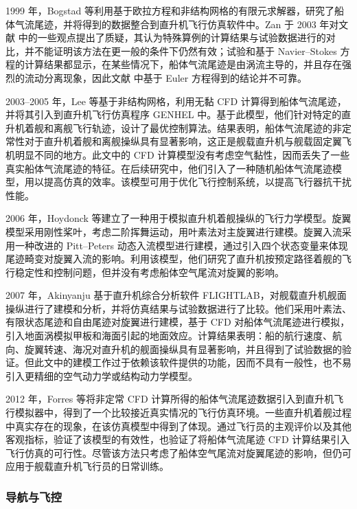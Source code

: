 1999 年，Bogstad 等利用基于欧拉方程和非结构网格的有限元求解器，研究了船体气流尾迹，并将得到的数据整合到直升机飞行仿真软件中。Zan
于 2003 年对文献 \cite{Bogstad2002} 中的一些观点提出了质疑，其认为特殊算例的计算结果与试验数据进行的对比，并不能证明该方法在更一般的条件下仍然有效；试验和基于
Navier–Stokes 方程的计算结果都显示，在某些情况下，船体气流尾迹是由涡流主导的，并且存在强烈的流动分离现象，因此文献 \cite{Bogstad2002}
中基于 Euler 方程得到的结论并不可靠。

2003–2005 年，Lee 等基于非结构网格，利用无黏 CFD 计算得到船体气流尾迹，并将其引入到直升机飞行仿真程序
GENHEL 中。基于此模型，他们针对特定的直升机着舰和离舰飞行轨迹，设计了最优控制算法。结果表明，船体气流尾迹的非定常性对于直升机着舰和离舰操纵具有显著影响，这正是舰载直升机与舰载固定翼飞机明显不同的地方。此文中的
CFD 计算模型没有考虑空气黏性，因而丢失了一些真实船体气流尾迹的特征。在后续研究中，他们引入了一种随机船体气流尾迹模型，用以提高仿真的效率。该模型可用于优化飞行控制系统，以提高飞行器抗干扰性能。

2006 年，Hoydonck 等建立了一种用于模拟直升机着舰操纵的飞行力学模型。旋翼模型采用刚性桨叶，考虑二阶挥舞运动，用叶素法对主旋翼进行建模。旋翼入流采用一种改进的
Pitt–Peters 动态入流模型进行建模，通过引入四个状态变量来体现尾迹畸变对旋翼入流的影响。利用该模型，他们研究了直升机按预定路径着舰的飞行稳定性和控制问题，但并没有考虑船体空气尾流对旋翼的影响。

2007 年，Akinyanju 基于直升机综合分析软件 FLIGHTLAB，对舰载直升机舰面操纵进行了建模和分析，并将仿真结果与试验数据进行了比较。他们采用叶素法、有限状态尾迹和自由尾迹对旋翼进行建模，基于
CFD 对船体气流尾迹进行模拟，引入地面涡模拟甲板和海面引起的地面效应。计算结果表明：船的航行速度、航向、旋翼转速、海况对直升机的舰面操纵具有显著影响，并且得到了试验数据的验证。但此文中的建模工作过于依赖该软件提供的功能，因而不具有一般性，也不易引入更精细的空气动力学或结构动力学模型。

2012 年，Forres 等将非定常 CFD 计算所得的船体气流尾迹数据引入到直升机飞行模拟器中，得到了一个比较接近真实情况的飞行仿真环境。一些直升机着舰过程中真实存在的现象，在该仿真模型中得到了体现。通过飞行员的主观评价以及其他客观指标，验证了该模型的有效性，也验证了将船体气流尾迹
CFD 计算结果引入飞行仿真的可行性。尽管该方法只考虑了船体空气尾流对旋翼尾迹的影响，但仍可应用于舰载直升机飞行员的日常训练。

\subsubsection{导航与飞控}

